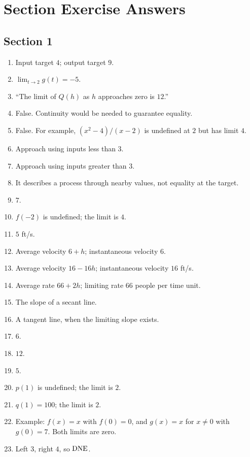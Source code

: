 \section{Section Exercise Answers}
\label{app:chapter-answers}

\subsection*{Section 1}

\begin{enumerate}[label=\textbf{1.\arabic*}]
  \item Input target \(4\); output target \(9\).
  \item \(\lim_{t\to2}g(t)=-5\).
  \item ``The limit of \(Q(h)\) as \(h\) approaches zero is \(12\).''
  \item False. Continuity would be needed to guarantee equality.
  \item False. For example, \((x^2-4)/(x-2)\) is undefined at \(2\) but has limit \(4\).
  \item Approach using inputs less than \(3\).
  \item Approach using inputs greater than \(3\).
  \item It describes a process through nearby values, not equality at the target.
  \item \(7\).
  \item \(f(-2)\) is undefined; the limit is \(4\).
  \item \(5\) ft/s.
  \item Average velocity \(6+h\); instantaneous velocity \(6\).
  \item Average velocity \(16-16h\); instantaneous velocity \(16\) ft/s.
  \item Average rate \(66+2h\); limiting rate \(66\) people per time unit.
  \item The slope of a secant line.
  \item A tangent line, when the limiting slope exists.
  \item \(6\).
  \item \(12\).
  \item \(5\).
  \item \(p(1)\) is undefined; the limit is \(2\).
  \item \(q(1)=100\); the limit is \(2\).
  \item Example: \(f(x)=x\) with \(f(0)=0\), and \(g(x)=x\) for \(x\ne0\) with \(g(0)=7\). Both limits are zero.
  \item Left \(3\), right \(4\), so \(\mathrm{DNE}\).

\end{enumerate}
